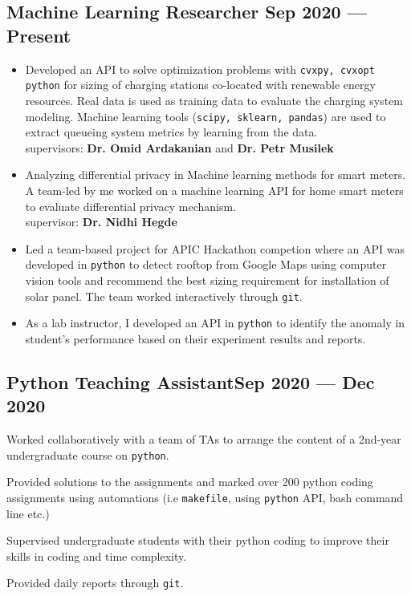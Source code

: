 \documentclass[letter,11pt]{article}
\begin{document}
\subsection{{Machine Learning Researcher \hfill Sep 2020 --- Present}}
\begin{itemize}
	\item Developed an API to solve optimization problems with \texttt{cvxpy, cvxopt python} for sizing of charging stations co-located with renewable energy resources. Real data is used as training data to evaluate the charging system modeling. Machine learning tools (\texttt{scipy, sklearn, pandas}) are used to extract queueing system metrics by learning from  the data.\\
	supervisors: \textbf{Dr. Omid Ardakanian} and \textbf{Dr. Petr Musilek}
	\item Analyzing differential privacy in Machine learning methods for smart meters. A team-led by me worked on a machine learning API for home smart meters to evaluate differential privacy mechanism.\\
	supervisor: \textbf{Dr. Nidhi Hegde}
	
	\item Led a team-based project for APIC Hackathon competion where an API was developed in \texttt{python} to detect rooftop from Google Maps using computer vision tools and recommend the best sizing requirement for installation of solar panel. The team worked interactively through \texttt{git}.
	
	\item As a lab instructor, I developed an API in \texttt{python} to identify the anomaly in student's performance based on their experiment results and reports. 
\end{itemize}

\subsection{{Python Teaching Assistant\hfill Sep 2020 --- Dec 2020}}
\begin{zitemize}
	\item Worked collaboratively with a team of TAs to arrange the content of a 2nd-year undergraduate course on \texttt{python}.
	\item Provided solutions to the assignments and marked over 200 python coding assignments using automations (i.e \texttt{makefile}, using \texttt{python} API, bash command line etc.)
	\item Supervised undergraduate students with their python coding to improve their skills in coding and time complexity.
	\item Provided daily reports through \texttt{git}.
\end{zitemize}
\end{document}
